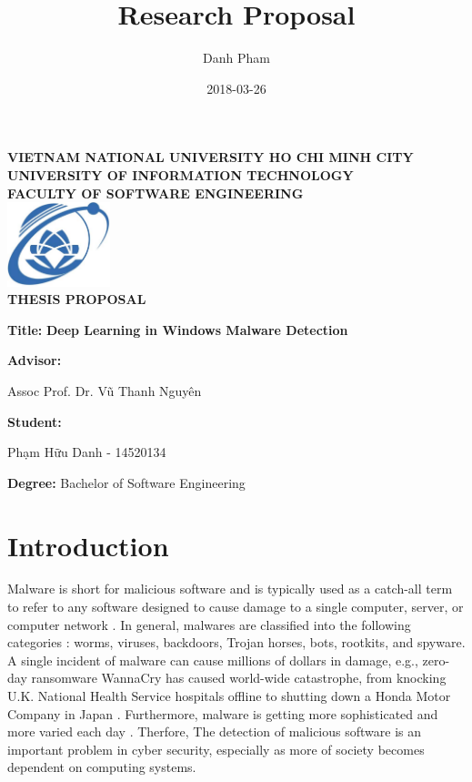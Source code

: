 \documentclass[12pt, a4paper]{article}
\title{Research Proposal}
\author{Danh Pham}
\date{2018-03-26}
\newcommand{\namelistlabel}[1]{\mbox{#1}\hfil}
\newenvironment{namelist}[1]{%
\begin{list}{}
    {
        \let\makelabel\namelistlabel
        \settowidth{\labelwidth}{#1}
        \setlength{\leftmargin}{1.1\labelwidth}
    }
  }{%
\end{list}}
\begin{document}
\begin{center}
\textbf{VIETNAM NATIONAL UNIVERSITY HO CHI MINH CITY} \\[2mm]
\textbf{UNIVERSITY OF INFORMATION TECHNOLOGY} \\ [2mm]
\textbf{FACULTY OF SOFTWARE ENGINEERING} \\ [1cm]
\includegraphics[width=30mm]{UIT_Logo} \\
\vspace{0.5cm}
\Large \textbf{THESIS PROPOSAL}
\vspace{0.5cm}
\end{center}


\begin{namelist}{Information}
\item[{\bf Title:}]
	\textbf{ \large Deep Learning in Windows Malware Detection}
\item[{\bf Advisor:}]
	\begin{otherlanguage}{vietnamese}
	Assoc Prof. Dr. Vũ Thanh Nguyên
	\end{otherlanguage}
\item[{\bf Student:}]
	\begin{otherlanguage}{vietnamese}
	Phạm Hữu Danh - 14520134
	\end{otherlanguage}
\item[{\bf Degree:}]
	Bachelor of Software Engineering
\end{namelist}

\section*{Introduction}

Malware is short for malicious software and is typically used as a catch-all term to refer to any software designed to cause damage to a single computer, server, or computer network \cite{moir2003defining}. In general, malwares are classified into the following categories \cite{egele2012survey}: worms, viruses, backdoors, Trojan horses, bots, rootkits, and spyware. A single incident of malware can cause millions of dollars in damage, e.g., zero-day ransomware WannaCry has caused world-wide catastrophe, from knocking U.K. National Health Service hospitals offline to shutting down a Honda Motor Company in Japan \cite{DBLP:journals/corr/abs-1709-08753}. Furthermore, malware is getting more sophisticated and more varied each day \cite{shahi2009technology}. Therfore, The detection of malicious software is an important problem in cyber security, especially as more of society becomes dependent on computing systems.
\end{document}
